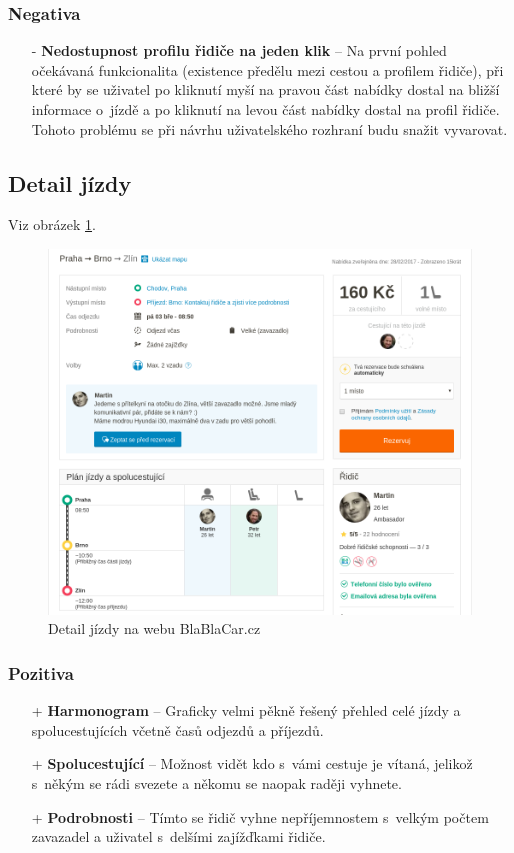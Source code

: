 \subsubsection*{Negativa}
\begin{itemize}
    \item[-] \textbf{Nedostupnost profilu řidiče na jeden klik} -- Na první pohled očekávaná funkcionalita (existence předělu mezi cestou a profilem řidiče), při které by se uživatel po kliknutí myší na pravou část nabídky dostal na bližší informace o~jízdě a po kliknutí na levou část nabídky dostal na profil řidiče. Tohoto problému se při návrhu uživatelského rozhraní budu snažit vyvarovat.
\end{itemize}



\newpage
\subsection{Detail jízdy}
Viz obrázek \ref{fig:blablacar:detail}.
\begin{figure}[h]
    \centering
    \includegraphics[width=1.0\textwidth]{media/blablacar/detail.png}
    \caption{Detail jízdy na webu BlaBlaCar.cz}
    \label{fig:blablacar:detail}
\end{figure}
\subsubsection*{Pozitiva}
\begin{itemize}
    \item[+] \textbf{Harmonogram} -- Graficky velmi pěkně řešený přehled celé jízdy a spolucestujících včetně časů odjezdů a příjezdů.
    \item[+] \textbf{Spolucestující} -- Možnost vidět kdo s~vámi cestuje je vítaná, jelikož s~někým se rádi svezete a někomu se naopak raději vyhnete.
    \item[+] \textbf{Podrobnosti} -- Tímto se řidič vyhne nepříjemnostem s~velkým počtem zavazadel a uživatel s~delšími zajížďkami řidiče.
\end{itemize}
